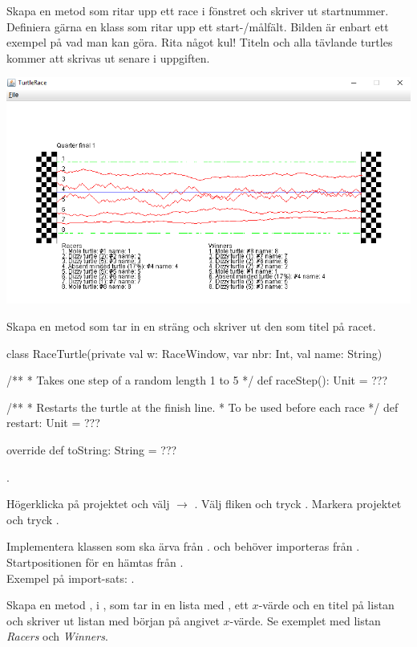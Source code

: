 \Subtask Skapa en metod  som ritar upp ett race i fönstret och skriver ut startnummer. Definiera gärna en klass som ritar upp ett start-/målfält. Bilden är enbart ett exempel på vad man kan göra. Rita något kul! Titeln och alla tävlande turtles kommer att skrivas ut senare i uppgiften.

\includegraphics[width=\textwidth]{../img/turtlerace/RaceWindow}

\Subtask Skapa en metod  som tar in en sträng och skriver ut den som titel på racet.

\begin{Code}
class RaceTurtle(private val w: RaceWindow,
			var nbr: Int, val name: String) {
  /**
   * Takes one step of a random length 1 to 5
   */
  def raceStep(): Unit = ???

  /**
   * Restarts the turtle at the finish line.
   * To be used before each race
   */
  def restart: Unit = ???

  override def toString: String = ???
}
\end{Code}

\Task {}.

\Subtask Högerklicka på projektet  och välj  $\rightarrow$ . Välj fliken  och tryck . Markera projektet  och tryck .

\Subtask Implementera klassen  som ska ärva från .  och  behöver importeras från . Startpositionen för en  hämtas från .\\Exempel på import-sats: .

\Subtask Skapa en metod , i , som tar in en lista med , ett $x$-värde och en titel på listan och skriver ut listan med början på angivet $x$-värde. Se exemplet med listan \textit{Racers} och \textit{Winners}.

